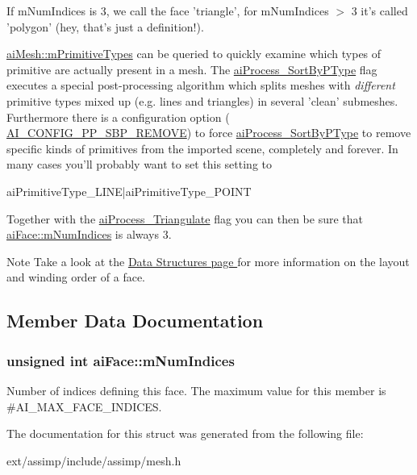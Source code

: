 If m\-Num\-Indices is 3, we call the face 'triangle', for m\-Num\-Indices $>$ 3 it's called 'polygon' (hey, that's just a definition!). \par
 \hyperlink{structai_mesh_a99d66ac0a444068c1b252b30265cbf53}{ai\-Mesh\-::m\-Primitive\-Types} can be queried to quickly examine which types of primitive are actually present in a mesh. The \hyperlink{postprocess_8h_a64795260b95f5a4b3f3dc1be4f52e410ab4484f73635d633cd79973bac1431ed6}{ai\-Process\-\_\-\-Sort\-By\-P\-Type} flag executes a special post-\/processing algorithm which splits meshes with {\itshape different} primitive types mixed up (e.\-g. lines and triangles) in several 'clean' submeshes. Furthermore there is a configuration option ( \hyperlink{config_8h_a971e337cb0d526861142586b8341cb98}{A\-I\-\_\-\-C\-O\-N\-F\-I\-G\-\_\-\-P\-P\-\_\-\-S\-B\-P\-\_\-\-R\-E\-M\-O\-V\-E}) to force \hyperlink{postprocess_8h_a64795260b95f5a4b3f3dc1be4f52e410ab4484f73635d633cd79973bac1431ed6}{ai\-Process\-\_\-\-Sort\-By\-P\-Type} to remove specific kinds of primitives from the imported scene, completely and forever. In many cases you'll probably want to set this setting to 
\begin{DoxyCode}
aiPrimitiveType\_LINE|aiPrimitiveType\_POINT
\end{DoxyCode}
 Together with the \hyperlink{postprocess_8h_a64795260b95f5a4b3f3dc1be4f52e410a9c3de834f0307f31fa2b1b6d05dd592b}{ai\-Process\-\_\-\-Triangulate} flag you can then be sure that \hyperlink{structai_face_adda2698cec0ebfe651572f4a5701360b}{ai\-Face\-::m\-Num\-Indices} is always 3. \begin{DoxyNote}{Note}
Take a look at the \hyperlink{}{Data Structures page } for more information on the layout and winding order of a face. 
\end{DoxyNote}


\subsection{Member Data Documentation}
\hypertarget{structai_face_adda2698cec0ebfe651572f4a5701360b}{
\subsubsection[{m\-Num\-Indices}]{\setlength{\rightskip}{0pt plus 5cm}unsigned int ai\-Face\-::m\-Num\-Indices}}\label{structai_face_adda2698cec0ebfe651572f4a5701360b}
Number of indices defining this face. The maximum value for this member is \#\-A\-I\-\_\-\-M\-A\-X\-\_\-\-F\-A\-C\-E\-\_\-\-I\-N\-D\-I\-C\-E\-S. 

The documentation for this struct was generated from the following file\-:\begin{DoxyCompactItemize}
\item 
ext/assimp/include/assimp/mesh.\-h\end{DoxyCompactItemize}
